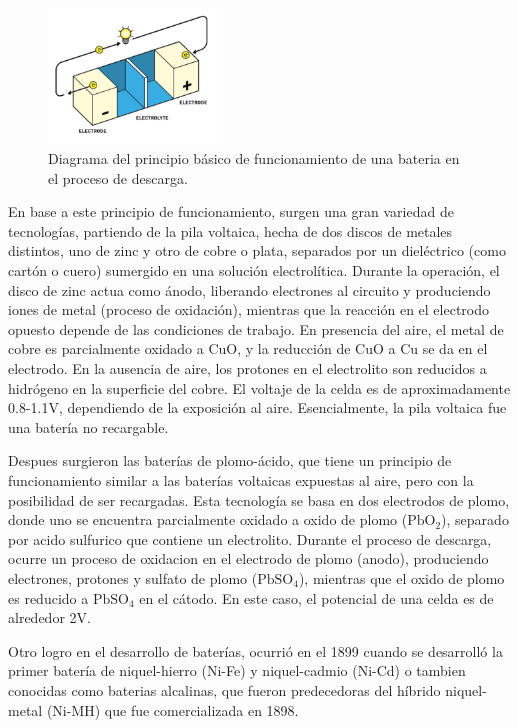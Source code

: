 \documentclass[10pt,a4paper]{article}
\begin{document}
\begin{figure}[h!]
    \begin{center}
	\includegraphics[width=0.4\textwidth]{batt_func_ppr.png}
    \end{center}
    \caption{Diagrama del principio básico de funcionamiento de una bateria en el
    proceso de descarga.}
    \label{batt_wk_ppl}
\end{figure}

\noindent En base a este principio de funcionamiento, surgen una gran variedad
de tecnologías, partiendo de la pila voltaica, hecha de dos discos de metales
distintos, uno de zinc y otro de cobre o plata, separados por un dieléctrico
(como cartón o cuero) sumergido en una solución electrolítica.  Durante la
operación, el disco de zinc actua como ánodo, liberando electrones al circuito y
produciendo iones de metal (proceso de oxidación), mientras que la reacción en
el electrodo opuesto depende de las condiciones de trabajo. En presencia del
aire, el metal de cobre es parcialmente oxidado a CuO, y la reducción de CuO a
Cu se da en el electrodo. En la ausencia de aire, los protones en el electrolito
son reducidos a hidrógeno en la superficie del cobre. El voltaje de la celda es
de aproximadamente 0.8-1.1V, dependiendo de la exposición al aire.
Esencialmente, la pila voltaica fue una batería no recargable.

\noindent Despues surgieron las baterías de plomo-ácido, que tiene un principio
de funcionamiento similar a las baterías voltaicas expuestas al aire, pero con
la posibilidad de ser recargadas. Esta tecnología se basa en dos electrodos de
plomo, donde uno se encuentra parcialmente oxidado a oxido de plomo
($\mathrm{PbO_2}$), separado por acido sulfurico que contiene un electrolito.
Durante el proceso de descarga, ocurre un proceso de oxidacion en el electrodo
de plomo (anodo), produciendo electrones, protones y sulfato de plomo
($\mathrm{PbSO_4}$), mientras que el oxido de plomo es reducido a
$\mathrm{PbSO_4}$ en el cátodo. En este caso, el potencial de una celda es de
alrededor 2V.

\noindent Otro logro en el desarrollo de baterías, ocurrió en el 1899 cuando se
desarrolló la primer batería de niquel-hierro (Ni-Fe) y niquel-cadmio (Ni-Cd) o
tambien conocidas como baterias alcalinas, que fueron predecedoras del híbrido
niquel-metal (Ni-MH) que fue comercializada en 1898.
\end{document}
